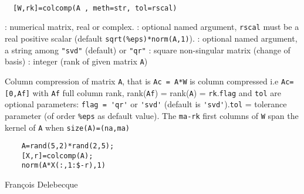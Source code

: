 \begin{mandesc}
   \\ %
\end{mandesc}

\begin{calling_sequence}
\begin{verbatim}
  [W,rk]=colcomp(A , meth=str, tol=rscal) 
\end{verbatim}
\end{calling_sequence}
\begin{parameters}
  \begin{varlist}
    : numerical matrix, real or complex.
    : optional named argument, \verb+rscal+ must be  a real positive scalar (default \verb+sqrt(%eps)*norm(A,1)+).
    : optional named argument, a string among \verb+"svd"+ (default) or \verb+"qr"+
    :  square non-singular matrix (change of basis)
    : integer (rank of given matrix \verb!A!)
  \end{varlist}
\end{parameters}
\begin{mandescription}
  Column compression of matrix \verb!A!, that is \verb!Ac = A*W! is 
  column compressed i.e \verb!Ac=[0,Af]! with \verb!Af! full column rank, 
  rank(\verb!Af!) = rank(\verb!A!) = \verb!rk!.\verb!flag! and \verb!tol! are optional parameters: \verb!flag = 'qr'! 
  or \verb!'svd'! (default is \verb!'svd'!).\verb!tol! = tolerance parameter (of order \verb!%eps! as default value).
  The \verb!ma-rk! first columns of \verb!W! span the kernel of \verb!A! 
  when \verb!size(A)=(na,ma)!
\end{mandescription}
\begin{examples}
  \begin{Verbatim}
    A=rand(5,2)*rand(2,5);
    [X,r]=colcomp(A);
    norm(A*X(:,1:$-r),1)
  \end{Verbatim}
\end{examples}
\begin{manseealso}
       
\end{manseealso}
\begin{authors}
  Fran\c{c}ois Delebecque
\end{authors}
